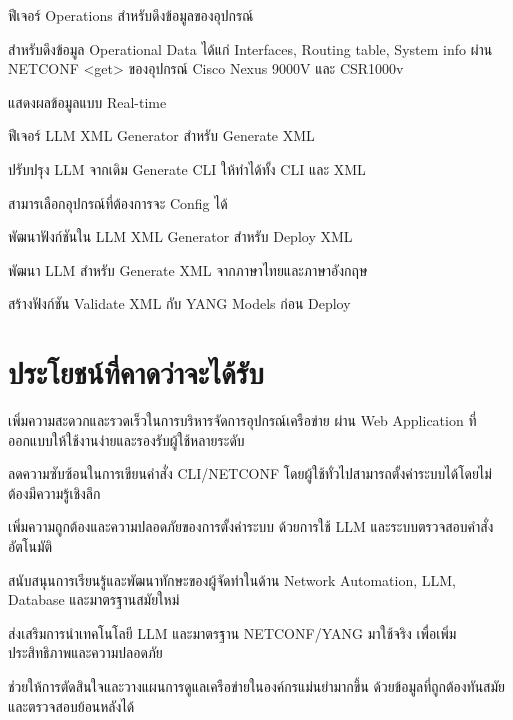 \begin{mycustomenum2}
    \item ฟีเจอร์ Operations สำหรับดึงข้อมูลของอุปกรณ์ 
    \begin{mycustomenum2}
        \item สำหรับดึงข้อมูล Operational Data ได้แก่ Interfaces, Routing table, System info ผ่าน NETCONF <get> ของอุปกรณ์ Cisco Nexus 9000V และ CSR1000v 
        \item แสดงผลข้อมูลแบบ Real-time 
    \end{mycustomenum2}

    \item ฟีเจอร์ LLM XML Generator สำหรับ Generate XML
    \begin{mycustomenum2}
        \item ปรับปรุง LLM จากเดิม Generate CLI ให้ทำได้ทั้ง CLI และ XML
        \item สามารเลือกอุปกรณ์ที่ต้องการจะ Config ได้  
        \item พัฒนาฟังก์ชันใน LLM XML Generator สำหรับ Deploy XML
        \item พัฒนา LLM  สำหรับ Generate XML จากภาษาไทยและภาษาอังกฤษ
        \item สร้างฟังก์ชัน Validate XML กับ YANG Models ก่อน Deploy
    \end{mycustomenum2}

\end{mycustomenum2}



\section{ประโยชน์ที่คาดว่าจะได้รับ}

\begin{mycustomenum}[label=1.4.\arabic*] %
    \item เพิ่มความสะดวกและรวดเร็วในการบริหารจัดการอุปกรณ์เครือข่าย ผ่าน Web Application ที่ออกแบบให้ใช้งานง่ายและรองรับผู้ใช้หลายระดับ 
    \item ลดความซับซ้อนในการเขียนคำสั่ง CLI/NETCONF โดยผู้ใช้ทั่วไปสามารถตั้งค่าระบบได้โดยไม่ต้องมีความรู้เชิงลึก 
    \item เพิ่มความถูกต้องและความปลอดภัยของการตั้งค่าระบบ ด้วยการใช้ LLM และระบบตรวจสอบคำสั่งอัตโนมัติ  
    \item สนับสนุนการเรียนรู้และพัฒนาทักษะของผู้จัดทำในด้าน Network Automation, LLM, Database และมาตรฐานสมัยใหม่
    \item ส่งเสริมการนำเทคโนโลยี LLM และมาตรฐาน NETCONF/YANG มาใช้จริง เพื่อเพิ่มประสิทธิภาพและความปลอดภัย  
    \item ช่วยให้การตัดสินใจและวางแผนการดูแลเครือข่ายในองค์กรแม่นยำมากขึ้น ด้วยข้อมูลที่ถูกต้องทันสมัย และตรวจสอบย้อนหลังได้ 
\end{mycustomenum}

